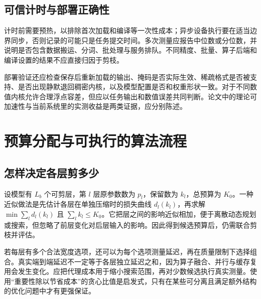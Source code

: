 \documentclass[UTF8,12pt,a4paper,fontset=fandol]{ctexart}
\begin{document}
\subsection{可信计时与部署正确性}
计时前需要预热，以排除首次加载和编译等一次性成本；异步设备执行要在适当边界同步，否则记录的可能只是任务提交时间。多次测量应报告中位数或分位数，并说明是否包含数据搬运、分词、批处理与服务排队。不同精度、批量、算子后端和编译设置的结果不应直接归因于剪枝。

部署验证还应检查保存后重新加载的输出、掩码是否实际生效、稀疏格式是否被支持、是否出现静默退回稠密内核，以及模型配置是否和权重形状一致。对于不同数值内核允许合理浮点容差，但应以任务输出和数值误差共同判断。论文中的理论可加速性与当前系统里的实测收益是两类证据，应分别陈述。

\section{预算分配与可执行的算法流程}
\label{sec:prune-procedure}

\subsection{怎样决定各层剪多少}
设模型有 $L_b$ 个可剪层，第 $l$ 层原参数数为 $p_l$，保留数为 $k_l$，总预算为 $K_0$。一种近似做法是先估计各层在单独压缩时的损失曲线 $d_l(k_l)$，再求解 $\min\sum_l d_l(k_l)$ 且 $\sum_l k_l\leq K_0$。它把层之间的影响近似相加，便于离散动态规划或搜索，但忽略了前层变化对后层输入的影响。因此得到候选预算后，仍需联合剪枝并评估。

若每层有多个合法宽度选项，还可以为每个选项测量延迟，再在质量限制下选择组合。真实端到端延迟不一定等于各层独立延迟之和，因为算子融合、并行与缓存复用会发生变化。应把代理成本用于缩小搜索范围，再对少数候选执行真实测量。使用“重要性除以节省成本”的贪心比值是启发式，只有在某些可分离且满足额外结构的优化问题中才有更强保证。
\end{document}
